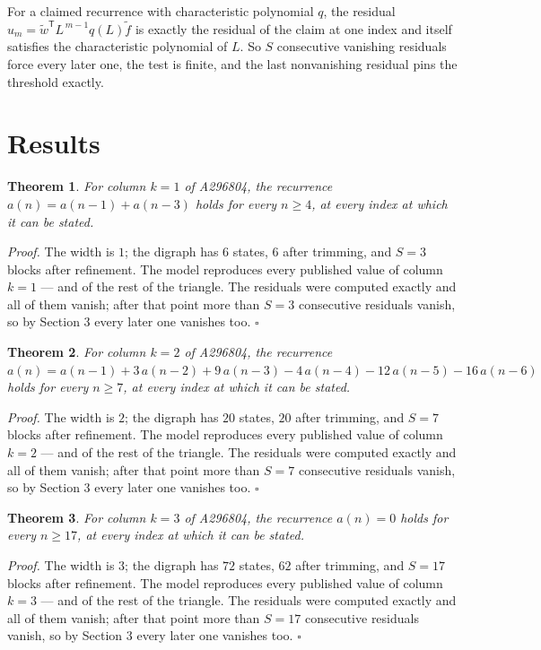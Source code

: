 \documentclass[11pt]{article}
\newtheorem{theorem}{Theorem}
\theoremstyle{definition}
\begin{document}
For a claimed recurrence with characteristic polynomial $q$, the residual $u_m = \tilde w^{\mathsf T}L^{\,m-1}q(L)\tilde f$ is exactly the residual of the claim at one index and itself satisfies the characteristic polynomial of $L$. So $S$ consecutive vanishing residuals force every later one, the test is finite, and the last nonvanishing residual pins the threshold exactly.

\section{Results}

\begin{theorem} For column $k = 1$ of A296804, the recurrence $a(n) = a(n-1) + a(n-3)$ holds for every $n \ge 4$, at every index at which it can be stated.\end{theorem}

{\itshape Proof.} The width is $1$; the digraph has $6$ states, $6$ after trimming, and $S = 3$ blocks after refinement. The model reproduces every published value of column $k = 1$ --- and of the rest of the triangle. The residuals were computed exactly and all of them vanish; after that point more than $S = 3$ consecutive residuals vanish, so by Section 3 every later one vanishes too. $\square$

\begin{theorem} For column $k = 2$ of A296804, the recurrence $a(n) = a(n-1) + 3\,a(n-2) + 9\,a(n-3) - 4\,a(n-4) - 12\,a(n-5) - 16\,a(n-6)$ holds for every $n \ge 7$, at every index at which it can be stated.\end{theorem}

{\itshape Proof.} The width is $2$; the digraph has $20$ states, $20$ after trimming, and $S = 7$ blocks after refinement. The model reproduces every published value of column $k = 2$ --- and of the rest of the triangle. The residuals were computed exactly and all of them vanish; after that point more than $S = 7$ consecutive residuals vanish, so by Section 3 every later one vanishes too. $\square$

\begin{theorem} For column $k = 3$ of A296804, the recurrence $a(n) = 0$ holds for every $n \ge 17$, at every index at which it can be stated.\end{theorem}

{\itshape Proof.} The width is $3$; the digraph has $72$ states, $62$ after trimming, and $S = 17$ blocks after refinement. The model reproduces every published value of column $k = 3$ --- and of the rest of the triangle. The residuals were computed exactly and all of them vanish; after that point more than $S = 17$ consecutive residuals vanish, so by Section 3 every later one vanishes too. $\square$
\end{document}
